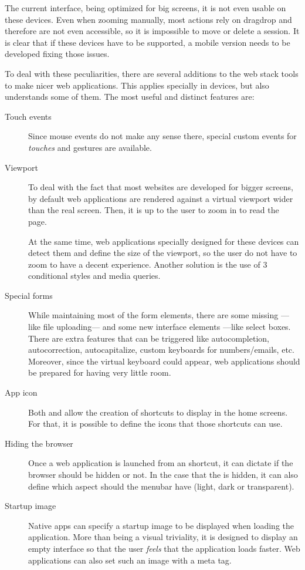The current  interface, being optimized for big screens, it is not even usable on these devices.
Even when zooming manually, most actions rely on drag\et{}drop and therefore are not even accessible, so it is impossible to move or delete a session.
It is clear that if these devices have to be supported, a mobile version needs to be developed fixing those issues.

To deal with these peculiarities, there are several additions to the web stack tools to make nicer web applications.
This applies specially in  devices, but  also understands some of them.
The most useful and distinct features are:

\begin{description}
  \item[Touch events] Since mouse events do not make any sense there, special custom events for \emph{touches} and gestures are available.
  \item[Viewport] To deal with the fact that most websites are developed for bigger screens, by default web applications are rendered against a virtual viewport wider than the real screen.
  Then, it is up to the user to zoom in to read the page.
  
  At the same time, web applications specially designed for these devices can detect them and define the size of the viewport, so the user do not have to zoom to have a decent experience.
  Another solution is the use of 3 conditional styles and media queries.
  \item[Special forms] While maintaining most of the form elements, there are some missing ---like file uploading--- and some new interface elements ---like select boxes.
  There are extra features that can be triggered like autocompletion, autocorrection, autocapitalize, custom keyboards for numbers/emails, etc.
  Moreover, since the virtual keyboard could appear, web applications should be prepared for having very little room.
  \item[App icon] Both  and  allow the creation of shortcuts to display in the home screens.
  For that, it is possible to define the icons that those shortcuts can use.
  \item[Hiding the browser ] Once a web application is launched from an  shortcut, it can dictate if the browser  should be hidden or not.
  In the case that the  is hidden, it can also define which aspect should the menubar have (light, dark or transparent).
  \item[Startup image] Native  apps can specify a startup image to be displayed when loading the application.
  More than being a visual triviality, it is designed to display an empty interface so that the user \emph{feels} that the application loads faster.
  Web applications can also set such an image with a meta tag.
\end{description}


